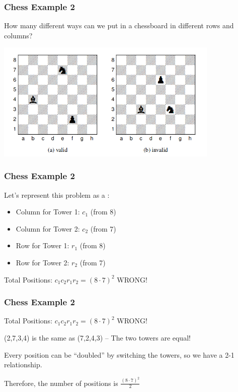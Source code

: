 \documentclass{beamer}
\begin{document}
\begin{frame}
  \frametitle{Chess Example 2}

  {\larger How many different ways can we put 
    in a chessboard \alert{in different rows and columns}?

  \bigskip

  \begin{center}
    \includegraphics[width=0.8\textwidth]{../img/chess_count1}
  \end{center}
  }
  
\end{frame}

\begin{frame}
  \frametitle{Chess Example 2}

  {\larger
  Let's represent this problem as a :
  \begin{itemize}
  \item Column for Tower 1: $c_1$ (from 8)
  \item Column for Tower 2: $c_2$ (from 7)
  \item Row for Tower 1: $r_1$ (from 8)
  \item Row for Tower 2: $r_2$ (from 7)
  \end{itemize}

  \bigskip

  Total Positions: $c_1c_2r_1r_2 = (8\cdot7)^2$ \hfill \alert{WRONG!}
  }
\end{frame}

\begin{frame}
  \frametitle{Chess Example 2}

  {\larger
    Total Positions: $c_1c_2r_1r_2 = (8\cdot7)^2$ \hfill \alert{WRONG!}

    \bigskip

    (2,7,3,4) is the same as (7,2,4,3) -- \alert{The two towers are equal!}

    \bigskip

    Every position can be ``doubled'' by switching the towers, so we
    have a 2-1 relationship.

    \bigskip
    
    Therefore, the number of positions is $\frac{(8\cdot7)^2}{2}$
  }
\end{frame}
\end{document}
